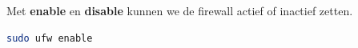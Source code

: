 Met \textbf{enable} en \textbf{disable} kunnen we de firewall actief of inactief zetten.
\begin{lstlisting}[language=bash]
sudo ufw enable
\end{lstlisting}

